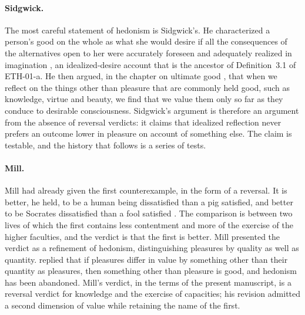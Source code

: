 \documentclass{situationist-preprint}
\begin{document}
\paragraph{Sidgwick.} The most careful statement of hedonism is Sidgwick's. He characterized a person's good on the whole as what she would desire if all the consequences of the alternatives open to her were accurately foreseen and adequately realized in imagination \citep[I.ix.3]{Sidgwick1907}, an idealized-desire account that is the ancestor of Definition~3.1 of ETH-01-a. He then argued, in the chapter on ultimate good \citep[III.xiv]{Sidgwick1907}, that when we reflect on the things other than pleasure that are commonly held good, such as knowledge, virtue and beauty, we find that we value them only so far as they conduce to desirable consciousness. Sidgwick's argument is therefore an argument from the absence of reversal verdicts: it claims that idealized reflection never prefers an outcome lower in pleasure on account of something else. The claim is testable, and the history that follows is a series of tests.

\paragraph{Mill.} Mill had already given the first counterexample, in the form of a reversal. It is better, he held, to be a human being dissatisfied than a pig satisfied, and better to be Socrates dissatisfied than a fool satisfied \citep[ch.~II]{Mill1861}. The comparison is between two lives of which the first contains less contentment and more of the exercise of the higher faculties, and the verdict is that the first is better. Mill presented the verdict as a refinement of hedonism, distinguishing pleasures by quality as well as quantity. \citet[\S\S46--48]{Moore1903} replied that if pleasures differ in value by something other than their quantity as pleasures, then something other than pleasure is good, and hedonism has been abandoned. Mill's verdict, in the terms of the present manuscript, is a reversal verdict for knowledge and the exercise of capacities; his revision admitted a second dimension of value while retaining the name of the first.
\end{document}
